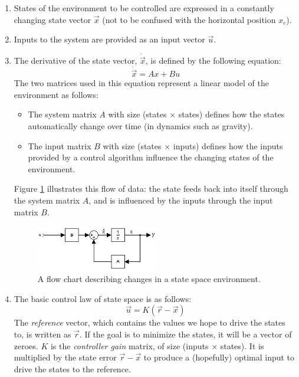 \documentclass[11pt]{article}
\begin{document}
\begin{enumerate}
    \item States of the environment to be controlled are expressed in a constantly changing state vector $\vec{x}$ (not to be confused with the horizontal position $x _c$).
    \item Inputs to the system are provided as an input vector $\vec{u}$.
    \item The derivative of the state vector, $\dot{\vec{x}}$, is defined by the following equation:
        \begin{equation} \label{state_derivative}
            \dot{\vec{x}} = A x + B u
        \end{equation}
        The two matrices used in this equation represent a linear model of the environment as follows:
        \begin{itemize}
            \item The system matrix $A$ with size (states $\times$ states) defines how the states automatically change over time (in dynamics such as gravity).
            \item The input matrix $B$ with size (states $\times$ inputs) defines how the inputs provided by a control algorithm influence the changing states of the environment.
        \end{itemize}
        Figure \ref{state_space} illustrates this flow of data: the state feeds back into itself through the system matrix $A$, and is influenced by the inputs through the input matrix $B$.
        \begin{figure}[ht]
            \centering
            \includegraphics[width=0.5\textwidth]{state_space}
            \caption{\label{state_space} A flow chart describing changes in a state space environment.}
        \end{figure}
    \item The basic control law of state space is as follows:
        \begin{equation} \label{control_law}
            \vec{u} = K(\vec{r} - \vec{x})
        \end{equation}
        The \textit{reference} vector, which contains the values we hope to drive the states to, is written as $\vec{r}$. If the goal is to minimize the states, it will be a vector of zeroes. $K$ is the \textit{controller gain} matrix, of size (inputs $\times$ states). It is multiplied by the state error $\vec{r} - \vec{x}$ to produce a (hopefully) optimal input to drive the states to the reference.
\end{enumerate}
\end{document}
